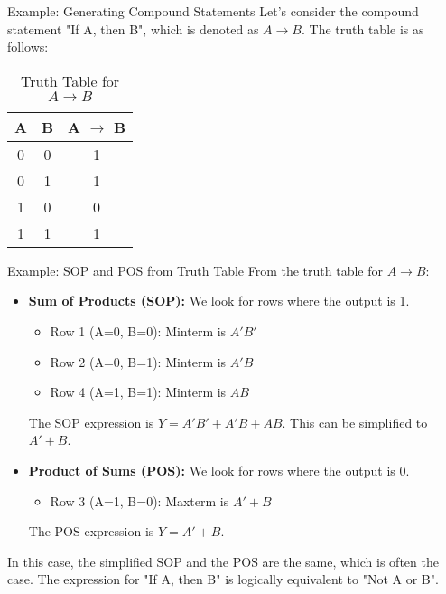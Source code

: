 \documentclass{beamer}
\begin{document}
\begin{frame}{Example: Generating Compound Statements}
    Let's consider the compound statement "If A, then B", which is denoted as $A \rightarrow B$. The truth table is as follows:
    \begin{table}
        \centering
        \begin{tabular}{|c|c|c|}
            \hline
            \textbf{A} & \textbf{B} & \textbf{A $\rightarrow$ B} \\
            \hline
            0 & 0 & 1 \\
            0 & 1 & 1 \\
            1 & 0 & 0 \\
            1 & 1 & 1 \\
            \hline
        \end{tabular}
        \caption{Truth Table for $A \rightarrow B$}
    \end{table}
\end{frame}

\begin{frame}{Example: SOP and POS from Truth Table}
    From the truth table for $A \rightarrow B$:
    \begin{itemize}
        \item \textbf{Sum of Products (SOP):} We look for rows where the output is 1.
        \begin{itemize}
            \item Row 1 (A=0, B=0): Minterm is $A'B'$
            \item Row 2 (A=0, B=1): Minterm is $A'B$
            \item Row 4 (A=1, B=1): Minterm is $AB$
        \end{itemize}
        The SOP expression is $Y = A'B' + A'B + AB$. This can be simplified to $A' + B$.
        
        \item \textbf{Product of Sums (POS):} We look for rows where the output is 0.
        \begin{itemize}
            \item Row 3 (A=1, B=0): Maxterm is $A'+B$
        \end{itemize}
        The POS expression is $Y = A'+B$.
    \end{itemize}
    In this case, the simplified SOP and the POS are the same, which is often the case. The expression for "If A, then B" is logically equivalent to "Not A or B".
\end{frame}
\end{document}
